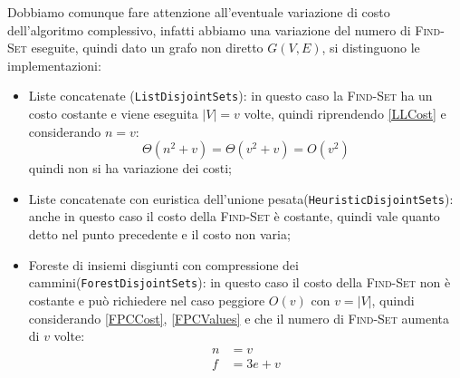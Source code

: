 \begin{enumerate}
\begin{enumerate}[resume]
                        Dobbiamo comunque fare attenzione all'eventuale variazione di costo dell'algoritmo complessivo, infatti abbiamo
                        una variazione del numero di \textsc{Find-Set} eseguite, quindi dato un grafo non diretto $G(V,E)$, si distinguono le implementazioni:
                        \begin{itemize}
                              \item Liste concatenate (\texttt{ListDisjointSets}): in questo caso la \textsc{Find-Set} ha un costo costante
                                    e viene eseguita $|V| = v$ volte, quindi riprendendo \eqref{LLCost} e considerando $n = v$:
                                    \begin{equation}
                                          \Theta(n^2 + v) = \Theta(v^2 + v) = O(v^2)
                                    \end{equation}
                                    quindi non si ha variazione dei costi;
                              \item Liste concatenate con euristica dell'unione pesata\linebreak (\texttt{HeuristicDisjointSets}): anche in
                                    questo caso il costo della \textsc{Find-Set} è costante, quindi vale quanto detto nel punto precedente
                                    e il costo non varia;
                              \item Foreste di insiemi disgiunti con compressione dei cammini\linebreak (\texttt{ForestDisjointSets}):
                                    in questo caso il costo della \textsc{Find-Set} non è costante e può richiedere nel caso peggiore
                                    $O(v)$ con $v = |V|$, quindi considerando \eqref{FPCCost}, \eqref{FPCValues} e che il numero di
                                    \textsc{Find-Set} aumenta di $v$ volte:
                                    \begin{equation}
                                          \label{NewFCCCost}
                                          \begin{aligned}
                                                n                                          & = v                                                         \\
                                                f                                          & = 3 e + v                                                   \\

\end{aligned}
\end{equation}
\end{itemize}
\end{enumerate}
\end{enumerate}

